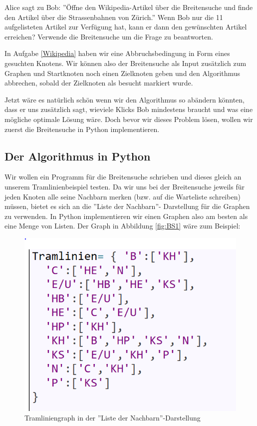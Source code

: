 \begin{aufgabe} \label{Wikipedia}
Alice sagt zu Bob: ''Öffne den Wikipedia-Artikel über die Breitensuche und finde den Artikel über die Strassenbahnen von Zürich.'' Wenn Bob nur die 11 aufgelisteten Artikel zur Verfügung hat, kann er dann den gewünschten Artikel erreichen? Verwende die Breitensuche um die Frage zu beantworten.
\end{aufgabe}

In Aufgabe \ref{Wikipedia} haben wir eine Abbruchsbedingung in Form eines gesuchten Knotens. Wir können also der Breitensuche als Input zusätzlich zum Graphen und Startknoten noch einen Zielknoten geben und den Algorithmus abbrechen, sobald der Zielknoten als besucht markiert wurde.

Jetzt wäre es natürlich schön wenn wir den Algorithmus so abändern könnten, dass er uns zusätzlich sagt, wieviele Klicks Bob mindestens braucht und was eine mögliche optimale Lösung wäre. Doch bevor wir dieses Problem lösen, wollen wir zuerst die Breitensuche in Python implementieren.

\subsection{Der Algorithmus in Python}
Wir wollen ein Programm für die Breitensuche schrieben und dieses gleich an unserem Tramlinienbeispiel testen.
Da wir uns bei der Breitensuche jeweils für jeden Knoten alle seine Nachbarn merken (bzw. auf die Warteliste schreiben) müssen, bietet es sich an die ''Liste der Nachbarn''- Darstellung für die Graphen zu verwenden.
In Python implementieren wir einen Graphen also am besten als eine Menge von Listen. Der Graph in Abbildung \ref{fig:BS1} wäre zum Beispiel:

\begin{figure}[H]
    \centering
    \includegraphics[scale=0.8]{Pictures/ListeDerNachbarn.PNG}
    \caption{Tramliniengraph in der ''Liste der Nachbarn''-Darstellung}
    \label{fig:Tram2}
\end{figure}

